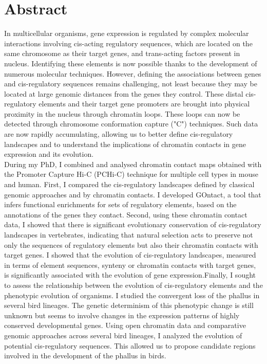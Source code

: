 \chapter*{Abstract}
\label{abstract}
In multicellular organisms, gene expression is regulated by complex molecular interactions involving \gls{cis}-acting regulatory sequences, which are located on the same chromosome as their target genes, and \gls{trans}-acting factors present in nucleus. Identifying these elements is now possible thanks to the development of numerous molecular techniques. However, defining the associations between genes and \gls{cis}-regulatory sequences remains challenging, not least because they may be located at large genomic distances from the genes they control. These distal \gls{cis}-regulatory elements and their target gene promoters are brought into physical proximity in the nucleus through chromatin loops. These loops can now be detected through chromosome conformation capture ("C") techniques. Such data are now rapidly accumulating, allowing us to better define \gls{cis}-regulatory landscapes and to understand the implications of chromatin contacts in gene expression and its evolution.\\

During my PhD, I combined and analysed chromatin contact maps obtained with the Promoter Capture Hi-C (PCHi-C) technique for multiple cell types in mouse and human. First, I compared the \gls{cis}-regulatory landscapes defined by classical genomic approaches and by chromatin contacts. I developed GOntact, a tool that infers functional enrichments for sets of regulatory elements, based on the annotations of the genes they contact. Second, using these chromatin contact data, I showed that there is significant evolutionary conservation of \gls{cis}-regulatory landscapes in vertebrates, indicating that natural selection acts to preserve not only the sequences of regulatory elements but also their chromatin contacts with target genes. I showed that the evolution of \gls{cis}-regulatory landscapes, measured in terms of element sequences, synteny or chromatin contacts with target genes, is significantly associated with the evolution of gene expression.Finally, I sought to assess the relationship between the evolution of \gls{cis}-regulatory elements and the phenotypic evolution of organisms. I studied the convergent loss of the phallus in several bird lineages. The genetic determinism of this phenotypic change is still unknown but seems to involve changes in the expression patterns of highly conserved developmental genes. Using open chromatin data and comparative genomic approaches across several bird lineages, I analyzed the evolution of potential \gls{cis}-regulatory sequences. This allowed us to propose candidate regions involved in the development of the phallus in birds.\\

